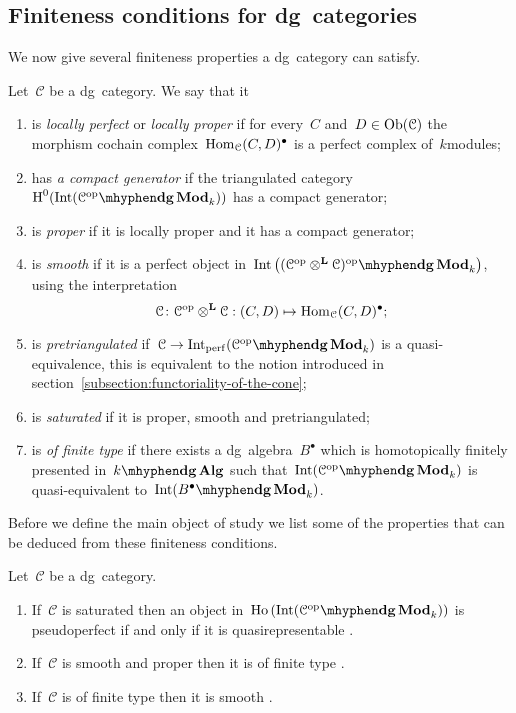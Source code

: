 \begin{refsection}
\subsection{Finiteness conditions for dg~categories}
We now give several finiteness properties a dg~category can satisfy.
\begin{definition}
  Let~$\mathcal{C}$ be a dg~category. We say that it
  \begin{enumerate}
    \item is \emph{locally perfect} or \emph{locally proper} if for every~$C$ and~$D\in\operatorname{Ob}(\mathcal{C})$ the morphism cochain complex~$\mathrm{Hom}_{\mathcal{C}}(C,D)^\bullet$ is a perfect complex of~$k$\dash modules;
    \item has \emph{a compact generator} if the triangulated category~$\HH^0(\Int(\dgMod{\mathcal{C}^\opp}_k))$ has a compact generator;
    \item is \emph{proper} if it is locally proper and it has a compact generator;
    \item is \emph{smooth} if it is a perfect object in~$\Int\left( \dgMod{(\mathcal{C}^\opp\otimes^{\mathbf{L}}\mathcal{C})^\opp}_k \right)$, using the interpretation
      \begin{equation}
        \mathcal{C}\colon\mathcal{C}^{\mathrm{op}}\otimes^{\mathbf{L}}\mathcal{C}:(C,D)\mapsto\mathrm{Hom}_{\mathcal{C}}(C,D)^\bullet;
      \end{equation}
    \item is \emph{pretriangulated} if~$\mathcal{C}\to\Int_\perf(\dgMod{\mathcal{C}^\opp}_k)$ is a quasi-equivalence, this is equivalent to the notion introduced in section~\ref{subsection:functoriality-of-the-cone};
    \item is \emph{saturated} if it is proper, smooth and pretriangulated;
    \item is \emph{of finite type} if there exists a dg~algebra~$B^\bullet$ which is homotopically finitely presented in~$\dgAlg$ such that~$\Int(\dgMod{\mathcal{C}^\opp}_k)$ is quasi-equivalent to~$\Int(\dgMod{B^\bullet}_k)$.
  \end{enumerate}
\end{definition}
Before we define the main object of study we list some of the properties that can be deduced from these finiteness conditions.
\begin{proposition}
  \label{proposition:dg-properties}
  Let~$\mathcal{C}$ be a dg~category.
  \begin{enumerate}
    \item If~$\mathcal{C}$ is saturated then an object in~$\Ho(\Int(\dgMod{\mathcal{C}^\opp}_k))$ is pseudoperfect if and only if it is quasirepresentable \cite[corollary 2.9(2)]{toen-vaquie-moduli-of-objects-in-dg-categories}.
    \item If~$\mathcal{C}$ is smooth and proper then it is of finite type \cite[corollary 2.13]{toen-vaquie-moduli-of-objects-in-dg-categories}.
    \item If~$\mathcal{C}$ is of finite type then it is smooth \cite[corollary 2.14]{toen-vaquie-moduli-of-objects-in-dg-categories}.
  \end{enumerate}
\end{proposition}


\end{refsection}
